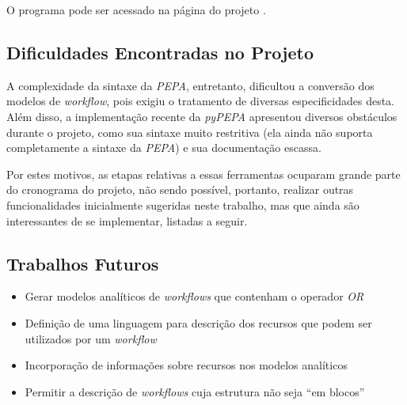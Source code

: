 \documentclass[a4paper,11pt]{article}
\begin{document}
    O programa pode ser acessado na p\'agina do projeto \cite{web:script}.

    \subsection{Dificuldades Encontradas no Projeto}

        A complexidade da sintaxe da \emph{PEPA}, entretanto, dificultou a convers\~ao dos modelos de \emph{workflow}, pois exigiu o tratamento de diversas especificidades desta. Al\'em disso, a implementação recente da \emph{pyPEPA} apresentou diversos obst\'aculos durante o projeto, como sua sintaxe muito restritiva (ela ainda não suporta completamente a sintaxe da \emph{PEPA}) e sua documentaç\~ao escassa. 

        Por estes motivos, as etapas relativas a essas ferramentas ocuparam grande parte do cronograma do projeto, n\~ao sendo poss\'ivel, portanto, realizar outras funcionalidades inicialmente sugeridas neste trabalho, mas que ainda s\~ao interessantes de se implementar, listadas a seguir.
    \subsection{Trabalhos Futuros}
      	\begin{itemize}
            \item Gerar modelos anal\'iticos de \emph{workflows} que contenham o operador \emph{OR}
            \item Definição de uma linguagem para descrição dos recursos que podem ser utilizados por um \emph{workflow}
      		\item Incorporação de informações sobre recursos nos modelos analíticos
            \item Permitir a descrição de \emph{workflows} cuja estrutura não seja ``em blocos''
      	\end{itemize}

  \newpage
  
  
\end{document}
